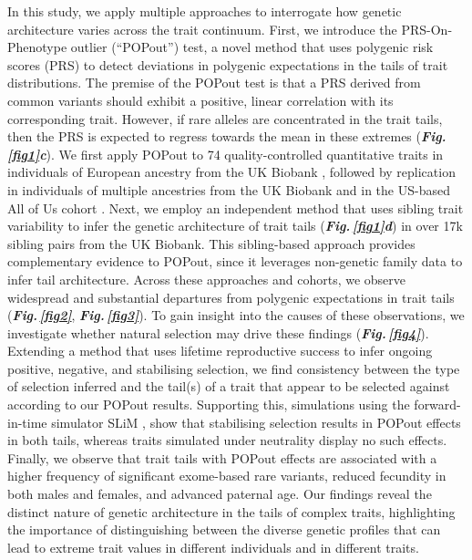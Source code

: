\documentclass[12pt]{zHenriquesLab-StyleBioRxiv}
\newcommand\fref[1]{\normalsize{\textbf{\textit{Fig.\,\ref{#1}}}}\normalsize{}}
\newcommand\dref[2]{\normalsize{\textbf{\textit{Fig.\,\ref{#1}#2}}}\normalsize{}}
\begin{document}
In this study, we apply multiple approaches to interrogate how genetic architecture varies 
across the trait continuum. First, we introduce the PRS-On-Phenotype outlier (“POPout”) test, 
a novel method that uses polygenic risk scores \cite{Choi2020} (PRS) to detect deviations 
in polygenic expectations in the tails of trait distributions. The premise of the POPout test 
is that a PRS derived from common variants should exhibit a positive, linear correlation with 
its corresponding trait. However, if rare alleles are concentrated in the trait tails, then the 
PRS is expected to regress towards the mean in these extremes (\dref{fig1}{c}). We first 
apply POPout to 74 quality-controlled quantitative traits in individuals of European ancestry 
from the UK Biobank \cite{Bycroft2018}, followed by replication in individuals of multiple ancestries 
from the UK Biobank and in the US-based All of Us cohort \cite{Bick2024}. Next, we employ an 
independent method \cite{Souaiaia2024} that uses sibling trait variability to infer the 
genetic architecture of trait tails (\dref{fig1}{d}) in over 17k sibling pairs from the UK Biobank. 
This sibling-based approach provides complementary evidence to POPout, since it leverages 
non-genetic family data to infer tail architecture. Across these approaches and cohorts, 
we observe widespread and substantial departures from polygenic expectations in trait tails (\fref{fig2}, \fref{fig3}). 
To gain insight into the causes of these observations, we investigate whether natural 
selection may drive these findings  (\fref{fig4}). Extending a method \cite{Sanjak2018} that 
uses lifetime reproductive success to infer ongoing positive, negative, and stabilising selection, 
we find consistency between the type of selection inferred and the tail(s) of a trait that 
appear to be selected against according to our POPout results. Supporting this, simulations using 
the forward-in-time simulator SLiM \cite{BC_2019}, show that stabilising selection results in POPout 
effects in both tails, whereas traits simulated under neutrality display no such effects. 
Finally, we observe that trait tails with POPout effects are associated with a higher frequency of 
significant exome-based rare variants, reduced fecundity in both males and females, and advanced 
paternal age. Our findings reveal the distinct nature of genetic architecture in the tails of 
complex traits, highlighting the importance of distinguishing between the diverse genetic profiles 
that can lead to extreme trait values in different individuals and in different traits.
\end{document}
